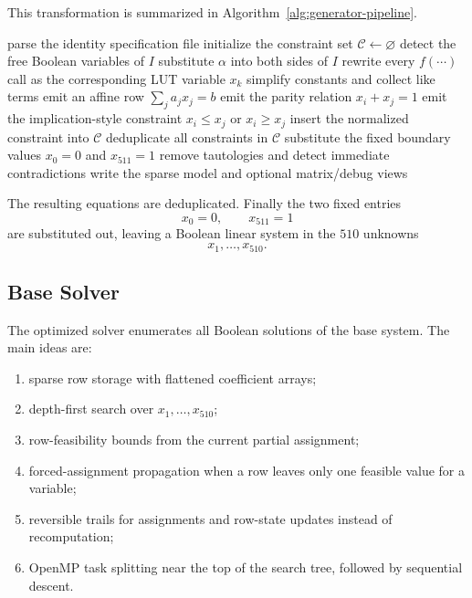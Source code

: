 \documentclass[11pt,a4paper]{article}
\newcommand{\F}[1]{f\!\left(#1\right)}
\begin{document}
This transformation is summarized in Algorithm~\ref{alg:generator-pipeline}.

\begin{algorithm}[t]
\caption{Functional identities to sparse Boolean constraints}
\label{alg:generator-pipeline}
\begin{algorithmic}[1]
\State parse the identity specification file
\State initialize the constraint set \(\mathcal{C} \gets \varnothing\)
  \State detect the free Boolean variables of \(I\)
    \State substitute \(\alpha\) into both sides of \(I\)
    \State rewrite every \(\F{\cdots}\) call as the corresponding LUT variable \(x_k\)
    \State simplify constants and collect like terms
      \State emit an affine row \(\sum_j a_j x_j = b\)
      \State emit the parity relation \(x_i + x_j = 1\)
    \Else
      \State emit the implication-style constraint \(x_i \le x_j\) or \(x_i \ge x_j\)
    \EndIf
    \State insert the normalized constraint into \(\mathcal{C}\)
  \EndFor
\EndFor
\State deduplicate all constraints in \(\mathcal{C}\)
\State substitute the fixed boundary values \(x_0 = 0\) and \(x_{511} = 1\)
\State remove tautologies and detect immediate contradictions
\State write the sparse model and optional matrix/debug views
\end{algorithmic}
\end{algorithm}

The resulting equations are deduplicated.  Finally the two fixed entries
\[
x_0=0,\qquad x_{511}=1
\]
are substituted out, leaving a Boolean linear system in the \(510\) unknowns
\[
x_1,\dots,x_{510}.
\]

\subsection{Base Solver}

The optimized solver enumerates all Boolean solutions of the base system.  The main ideas are:
\begin{enumerate}
\item sparse row storage with flattened coefficient arrays;
\item depth-first search over \(x_1,\dots,x_{510}\);
\item row-feasibility bounds from the current partial assignment;
\item forced-assignment propagation when a row leaves only one feasible value for a variable;
\item reversible trails for assignments and row-state updates instead of recomputation;
\item OpenMP task splitting near the top of the search tree, followed by sequential descent.
\end{enumerate}
\end{document}
